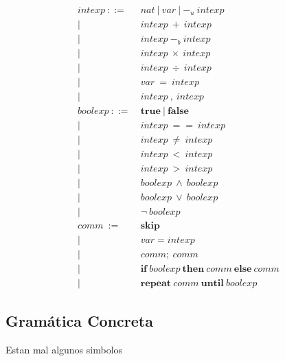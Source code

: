 \documentclass[11pt]{article}
\begin{document}
\begin{align*}
    intexp\ ::=\ & nat\ |\ var\ |\ -_u\ intexp \\
            |\ \ & intexp\ +\ intexp \\ 
            |\ \ & intexp\ -_b\ intexp \\ 
            |\ \ & intexp\ \times\ intexp \\ 
            |\ \ & intexp\ \div\ intexp \\ 
            |\ \ & var\ =\ intexp \\
            |\ \ & intexp\ ,\ intexp \\
    boolexp\ ::=\ & \textbf{true}\ |\ \textbf{false} \\
             |\ \ & intexp\ ==\ intexp \\
             |\ \ & intexp\ \ne\ intexp \\
             |\ \ & intexp\ <\ intexp \\
             |\ \ & intexp\ >\ intexp \\
             |\ \ & boolexp\ \wedge\ boolexp \\
             |\ \ & boolexp\ \vee\ boolexp \\
             |\ \ & \neg\ boolexp \\
    comm\ :=\ & \textbf{skip} \\
          |\ \ & var = intexp \\
          |\ \ & comm;\ comm \\
          |\ \ & \textbf{if}\ boolexp\ \textbf{then}\ comm\ \textbf{else}\ comm \\
          |\ \ & \textbf{repeat}\ comm\ \textbf{until}\ boolexp
\end{align*}

\subsection*{Gramática Concreta}

Estan mal algunos simbolos
\end{document}
